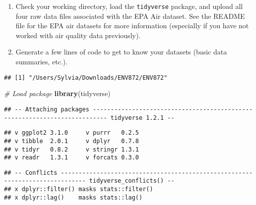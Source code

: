 \documentclass[]{article}
\newenvironment{Shaded}{\begin{snugshade}}{\end{snugshade}}
\newcommand{\KeywordTok}[1]{\textcolor[rgb]{0.13,0.29,0.53}{\textbf{#1}}}
\newcommand{\CommentTok}[1]{\textcolor[rgb]{0.56,0.35,0.01}{\textit{#1}}}
\newcommand{\NormalTok}[1]{#1}
\begin{document}
\begin{enumerate}
\def\labelenumi{\arabic{enumi}.}
\item
  Check your working directory, load the \texttt{tidyverse} package, and
  upload all four raw data files associated with the EPA Air dataset.
  See the README file for the EPA air datasets for more information
  (especially if you have not worked with air quality data previously).
\item
  Generate a few lines of code to get to know your datasets (basic data
  summaries, etc.).
\end{enumerate}

\begin{Shaded}
\end{Shaded}

\begin{verbatim}
## [1] "/Users/Sylvia/Downloads/ENV872/ENV872"
\end{verbatim}

\begin{Shaded}
\begin{Highlighting}[]
\CommentTok{# Load package}
\KeywordTok{library}\NormalTok{(tidyverse)}
\end{Highlighting}
\end{Shaded}

\begin{verbatim}
## -- Attaching packages -------------------------------------------------------------------------- tidyverse 1.2.1 --
\end{verbatim}

\begin{verbatim}
## v ggplot2 3.1.0     v purrr   0.2.5
## v tibble  2.0.1     v dplyr   0.7.8
## v tidyr   0.8.2     v stringr 1.3.1
## v readr   1.3.1     v forcats 0.3.0
\end{verbatim}

\begin{verbatim}
## -- Conflicts ----------------------------------------------------------------------------- tidyverse_conflicts() --
## x dplyr::filter() masks stats::filter()
## x dplyr::lag()    masks stats::lag()
\end{verbatim}
\end{document}
